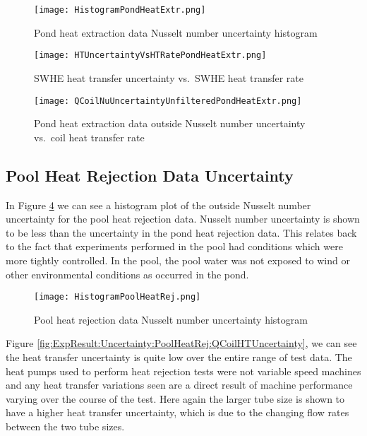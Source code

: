  \begin{figure}
	\centering
	\texttt{[image: HistogramPondHeatExtr.png]}
	\caption{Pond heat extraction data Nusselt number uncertainty histogram}
	\label{fig:ExpResult:Uncertainty:PondHeatExtr:HistogramPondHeatExtr}
\end{figure}

\begin{figure}
	\centering
	\texttt{[image: HTUncertaintyVsHTRatePondHeatExtr.png]}
	\caption{SWHE heat transfer uncertainty vs.\ SWHE heat transfer rate}
	\label{fig:ExpResult:Uncertainty:PondHeatExtr:HTUncertaintyVsHTRatePondHeatExtr}
\end{figure}

\begin{figure}
	\centering
	\texttt{[image: QCoilNuUncertaintyUnfilteredPondHeatExtr.png]}
	\caption{Pond heat extraction data outside Nusselt number uncertainty vs.\ coil heat transfer rate}	\label{fig:ExpResult:Uncertainty:PondHeatExtr:QCoilNuUncertaintyUnfilteredPondHeatExtr}
\end{figure}

\subsection{Pool Heat Rejection Data Uncertainty}
\label{subsec:ExpResult:Uncertainty:PoolRej}

In Figure \ref{fig:ExpResult:Uncertainty:PoolHeatRej:HistogramPoolHeatRej} we can see a histogram plot of the outside Nusselt number uncertainty for the pool heat rejection data. Nusselt number uncertainty is shown to be less than the uncertainty in the pond heat rejection data. This relates back to the fact that experiments performed in the pool had conditions which were more tightly controlled. In the pool, the pool water was not exposed to wind or other environmental conditions as occurred in the pond.

\begin{figure}
	\centering
	\texttt{[image: HistogramPoolHeatRej.png]}
	\caption{Pool heat rejection data Nusselt number uncertainty histogram}
	\label{fig:ExpResult:Uncertainty:PoolHeatRej:HistogramPoolHeatRej}
\end{figure}

Figure \ref{fig:ExpResult:Uncertainty:PoolHeatRej:QCoilHTUncertainty}, we can see the heat transfer uncertainty is quite low over the entire range of test data. The heat pumps used to perform heat rejection tests were not variable speed machines and any heat transfer variations seen are a direct result of machine performance varying over the course of the test. Here again the larger tube size is shown to have a higher heat transfer uncertainty, which is due to the changing flow rates between the two tube sizes.

